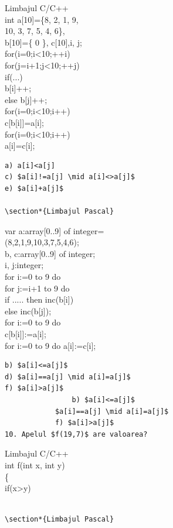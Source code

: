 \documentclass[10pt]{article}
\begin{document}
Limbajul C/C++\\[0pt]
int a[10]=\{8, 2, 1, 9,\\
10, 3, 7, 5, 4, 6\},\\[0pt]
b[10]=\{ 0 \}, c[10],i, j;\\
for(i=0;i<10;++i)\\
for(j=i+1;j<10;++j)\\
if(...)\\[0pt]
b[i]++;\\[0pt]
else b[j]++;\\
for(i=0;i<10;i++)\\[0pt]
c[b[i]]=a[i];\\
for(i=0;i<10;i++)\\[0pt]
a[i]=c[i];

\begin{verbatim}
a) a[i]<a[j]
c) $a[i]!=a[j] \mid a[i]<>a[j]$
e) $a[i]+a[j]$

\section*{Limbajul Pascal}
\end{verbatim}

var a:array[0..9] of integer=\\
(8,2,1,9,10,3,7,5,4,6);\\[0pt]
b, c:array[0..9] of integer;\\
i, j:integer;\\
for i:=0 to 9 do\\
for j:=i+1 to 9 do\\[0pt]
if ..... then inc(b[i])\\[0pt]
else inc(b[j]);\\
for i:=0 to 9 do\\[0pt]
c[b[i]]:=a[i];\\[0pt]
for i:=0 to 9 do a[i]:=c[i];

\begin{verbatim}
b) $a[i]<=a[j]$
d) $a[i]==a[j] \mid a[i]=a[j]$
f) $a[i]>a[j]$
                b) $a[i]<=a[j]$
            $a[i]==a[j] \mid a[i]=a[j]$
            f) $a[i]>a[j]$
10. Apelul $f(19,7)$ are valoarea?
\end{verbatim}

Limbajul C/C++\\
int f(int x, int y)\\
\{\\
if(x>y)

\begin{verbatim}

\section*{Limbajul Pascal}
\end{verbatim}
\end{document}
